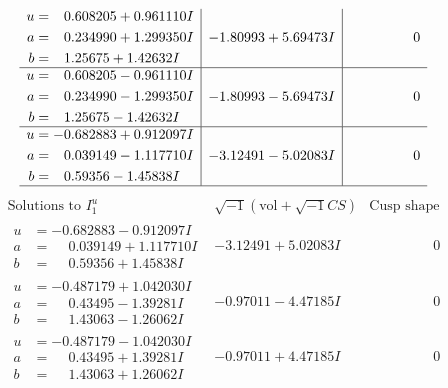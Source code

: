 \documentclass[1p]{elsarticle_modified}
\theoremstyle{definition}
\newcommand{\I}{\sqrt{-1}}
\begin{document}
$$\begin{array}{c|c|c}
\begin{aligned}
u &= \phantom{-}0.608205 + 0.961110 I \\
a &= \phantom{-}0.234990 + 1.299350 I \\
b &= \phantom{-}1.25675 + 1.42632 I\end{aligned}
 & -1.80993 + 5.69473 I & \phantom{-0.000000 } 0 \\ \hline\begin{aligned}
u &= \phantom{-}0.608205 - 0.961110 I \\
a &= \phantom{-}0.234990 - 1.299350 I \\
b &= \phantom{-}1.25675 - 1.42632 I\end{aligned}
 & -1.80993 - 5.69473 I & \phantom{-0.000000 } 0 \\ \hline\begin{aligned}
u &= -0.682883 + 0.912097 I \\
a &= \phantom{-}0.039149 - 1.117710 I \\
b &= \phantom{-}0.59356 - 1.45838 I\end{aligned}
 & -3.12491 - 5.02083 I & \phantom{-0.000000 } 0\\
 \hline 
 \end{array}$$\newpage$$\begin{array}{c|c|c}  
\text{Solutions to }I^u_{1}& \I (\text{vol} + \sqrt{-1}CS) & \text{Cusp shape}\\
 \hline 
\begin{aligned}
u &= -0.682883 - 0.912097 I \\
a &= \phantom{-}0.039149 + 1.117710 I \\
b &= \phantom{-}0.59356 + 1.45838 I\end{aligned}
 & -3.12491 + 5.02083 I & \phantom{-0.000000 } 0 \\ \hline\begin{aligned}
u &= -0.487179 + 1.042030 I \\
a &= \phantom{-}0.43495 - 1.39281 I \\
b &= \phantom{-}1.43063 - 1.26062 I\end{aligned}
 & -0.97011 - 4.47185 I & \phantom{-0.000000 } 0 \\ \hline\begin{aligned}
u &= -0.487179 - 1.042030 I \\
a &= \phantom{-}0.43495 + 1.39281 I \\
b &= \phantom{-}1.43063 + 1.26062 I\end{aligned}
 & -0.97011 + 4.47185 I & \phantom{-0.000000 } 0 \\ \hline\begin{aligned}

\end{aligned}
\end{array}$$
\end{document}

